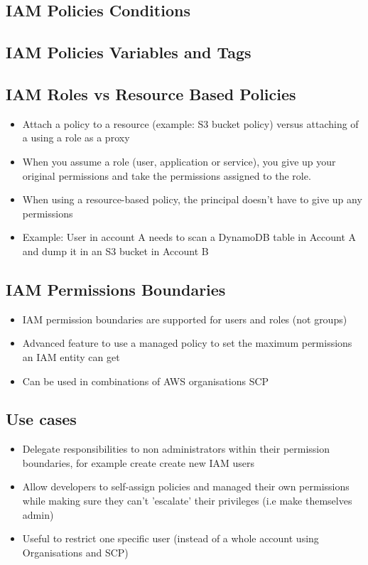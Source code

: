 \subsection{IAM Policies Conditions}

\subsection{IAM Policies Variables and Tags}

\subsection{IAM Roles vs Resource Based Policies}
\begin{itemize}
    \item Attach a policy to a resource (example: S3 bucket policy) versus attaching of a using a role as a proxy
    \item When you assume a role (user, application or service), you give up your original permissions and take the permissions assigned to the role.
    \item When using a resource-based policy, the principal doesn't have to give up any permissions
    \item Example: User in account A needs to scan a DynamoDB table in Account A and dump it in an S3 bucket in Account B
\end{itemize}

\subsection{IAM Permissions Boundaries}
\begin{itemize}
    \item IAM permission boundaries are supported for users and roles (not groups)
    \item Advanced feature to use a managed policy to set the maximum permissions an IAM entity can get
    \item Can be used in combinations of AWS organisations SCP
\end{itemize}

\subsection{Use cases}

\begin{itemize}
    \item Delegate responsibilities to non administrators within their permission boundaries, for example create create new IAM users
    \item Allow developers to self-assign policies and managed their own permissions while making sure they can't 'escalate' their privileges (i.e make themselves admin)
    \item Useful to restrict one specific user (instead of a whole account using Organisations and SCP)
\end{itemize}

